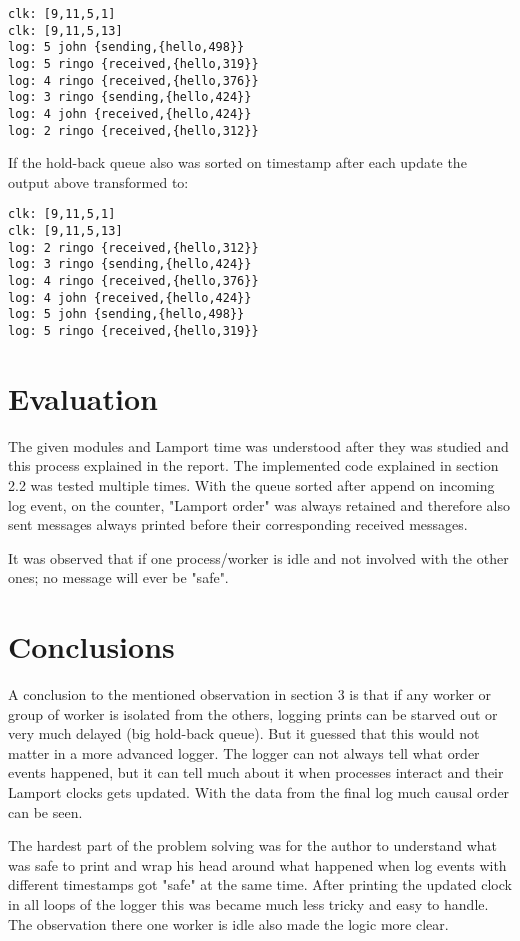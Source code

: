 \documentclass[a4paper, 11pt]{article}
\begin{document}
\begin{verbatim}
clk: [9,11,5,1]
clk: [9,11,5,13]
log: 5 john {sending,{hello,498}}
log: 5 ringo {received,{hello,319}}
log: 4 ringo {received,{hello,376}}
log: 3 ringo {sending,{hello,424}}
log: 4 john {received,{hello,424}}
log: 2 ringo {received,{hello,312}}
\end{verbatim}

If the hold-back queue also was sorted on timestamp after each update the output above transformed to:

\begin{verbatim}
clk: [9,11,5,1]
clk: [9,11,5,13]
log: 2 ringo {received,{hello,312}}
log: 3 ringo {sending,{hello,424}}
log: 4 ringo {received,{hello,376}}
log: 4 john {received,{hello,424}}
log: 5 john {sending,{hello,498}}
log: 5 ringo {received,{hello,319}}
\end{verbatim}

\section{Evaluation}

The given modules and Lamport time was understood after they was studied and this process explained in the report. The implemented code explained in section 2.2 was tested multiple times. With the queue sorted after append on incoming log event, on the counter, "Lamport order" was always retained and therefore also sent messages always printed before their corresponding received messages.

It was observed that if one process/worker is idle and not involved with the other ones; no message will ever be "safe".

\section{Conclusions}

A conclusion to the mentioned observation in section 3 is that if any worker or group of worker is isolated from the others, logging prints can be starved out or very much delayed (big hold-back queue). But it guessed that this would not matter in a more advanced logger. The logger can not always tell what order events happened, but it can tell much about it when processes interact and their Lamport clocks gets updated. With the data from the final log much causal order can be seen.

The hardest part of the problem solving was for the author to understand what was safe to print and wrap his head around what happened when log events with different timestamps got "safe" at the same time. After printing the updated clock in all loops of the logger this was became much less tricky and easy to handle. The observation there one worker is idle also made the logic more clear.
\end{document}
